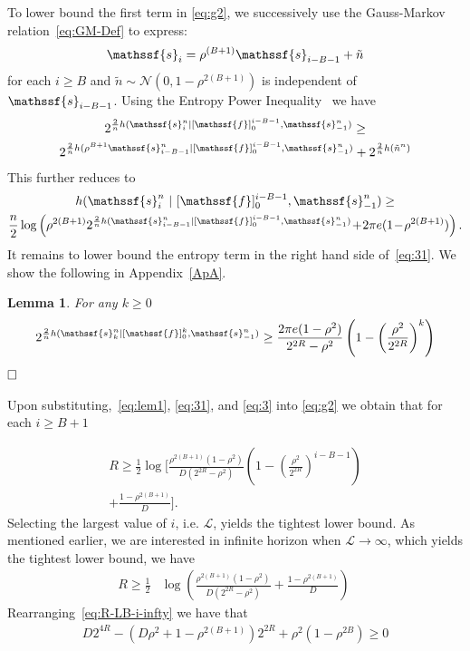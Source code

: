 \documentclass[journal, twocolumn, 10pt]{IEEEtran}
\newtheorem{lemma}{Lemma}
\newcommand{\cN}{{\mathcal{N}}}
\newcommand{\rvf}{{\mathssf{f}}}    %
\newcommand{\rvs}{{\mathssf{s}}}    %
\begin{document}
To lower bound the first term in \eqref{eq:g2}, we successively use the Gauss-Markov relation~\eqref{eq:GM-Def} to express:
\begin{align}
\rvs_{i} =\rho^{(B+1)} \rvs_{i-B-1} + \tilde{n} \label{eq:GM-Successive}
\end{align} for each $i \ge B$ and $\tilde{n}\sim \cN(0,1-\rho^{2(B+1)})$ is independent of $\rvs_{i-B-1}$. 
Using the Entropy Power Inequality~\cite{coverThomas} we have
\begin{multline}
2^{\frac{2}{n}h(\rvs^n_{i}|[\rvf]_{0}^{i-B-1}, \rvs^n_{-1})}\ge \\ 2^{\frac{2}{n}h(\rho^{B+1} \rvs^n_{i-B-1}|[\rvf]_{0}^{i-B-1}, \rvs^n_{-1})}+ 2^{\frac{2}{n}h(\tilde{n}^n)}
\end{multline} This further reduces to
\begin{multline}
h(\rvs^n_{i}~|~[\rvf]_{0}^{i-B-1}, \rvs^n_{-1})  \ge \\ \frac{n}{2} \log \left( \rho^{2(B+1)}2^{\frac{2}{n}h(\rvs^n_{i-B-1}|[\rvf]_{0}^{i-B-1}, \rvs^n_{-1})} \!+\!2 \pi e (1\!-\!\rho^{2({B+1})}) \right).\label{eq:31}
\end{multline} 
It remains to lower bound the entropy term in the right hand side of~\eqref{eq:31}. We show the following in Appendix~\ref{ApA}. 
\begin{lemma}
\label{lem:1}
For any $k\ge 0$ 
\begin{align}
2^{\frac{2}{n}h(\rvs^n_{k}|[\rvf]_{0}^{k}, \rvs_{-1}^n)} \ge  \frac{2 \pi e(1-\rho^2)}{2^{2R}-\rho^2}\left(1-\left(\frac{\rho^2}{2^{2R}}\right)^k\right)  \label{eq:lem1}
\end{align}
$\hfill\Box$
\end{lemma} 

Upon substituting,~\eqref{eq:lem1}, \eqref{eq:31}, and \eqref{eq:3} into \eqref{eq:g2} we obtain that for each ${i \ge B+1}$

\begin{multline}
R \ge  \frac{1}{2} \log \bigg[ \frac{\rho^{2(B+1)}(1-\rho^2)}{D(2^{2R}-\rho^2)}\left(1-\left(\frac{\rho^2}{2^{2R}}\right)^{i-B-1}\right) \\ + \frac{1-\rho^{2(B+1)}}{D} \bigg].
\end{multline} 
{Selecting the largest value of $i$, i.e.  $\mathcal{L}$, yields the tightest lower bound. As mentioned earlier, we are interested in infinite horizon when $\mathcal{L}\to \infty$,
which yields the tightest lower bound, we have}
\begin{align}
R \ge \frac{1}{2} &\log \left( \frac{\rho^{2(B+1)}(1-\rho^2)}{D(2^{2R}-\rho^2)} + \frac{1-\rho^{2(B+1)}}{D} \right)~\label{eq:R-LB-i-infty}
\end{align}
Rearranging~\eqref{eq:R-LB-i-infty} we have that
\begin{align}
D2^{4R} - (D\rho^2 +1 -\rho^{2(B+1)}) 2^{2R} + \rho^2 (1-\rho^{2B}) \ge 0 \label{eq:quad}
\end{align} 
\end{document}
